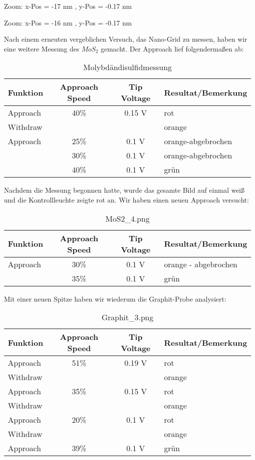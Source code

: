 Zoom: x-Pos = -17 nm , y-Pos = -0.17 nm
 

Zoom: x-Pos = -16 nm , y-Pos = -0.17 nm 


Nach einem erneuten vergeblichen Versuch, das Nano-Grid zu messen, haben wir eine weitere Messung des $MoS_2$ gemacht. Der Approach lief folgendermaßen ab:

\begin{table}[H]
\caption{Molybdändisulfidmessung}
\centering \begin{tabular}[H]{l c c l} 
Funktion & Approach Speed & Tip Voltage & Resultat/Bemerkung\\ \hline
Approach & 40\% & 0.15 V & rot\\
Withdraw & & & orange\\
Approach & 25\% & 0.1 V & orange-abgebrochen\\
 & 30\% & 0.1 V & orange-abgebrochen\\
 & 40\% & 0.1 V & grün\\
\end{tabular}
\end{table}

Nachdem die Messung begonnen hatte, wurde das gesamte Bild auf einmal weiß und die Kontrollleuchte zeigte rot an. Wir haben einen neuen Approach versucht:

\begin{table}[H]
\caption{MoS2\_4.png}
\centering \begin{tabular}[H]{l c c l}
Funktion & Approach Speed & Tip Voltage & Resultat/Bemerkung\\ \hline
Approach & 30\% & 0.1 V & orange - abgebrochen\\
 & 35\% & 0.1 V & grün
\end{tabular}
\end{table}


Mit einer neuen Spitze haben wir wiederum die Graphit-Probe analysiert:

\begin{table}[H]
\caption{Graphit\_3.png}
\centering \begin{tabular}[H]{l c c l}
Funktion & Approach Speed & Tip Voltage & Resultat/Bemerkung\\ \hline
Approach & 51\% & 0.19 V & rot\\
Withdraw & & & orange\\
Approach & 35\% & 0.15 V & rot\\
Withdraw & & & orange\\
Approach& 20\% & 0.1 V & rot\\
Withdraw & & & orange\\
Approach & 39\% & 0.1 V & grün\\
\end{tabular}
\end{table}

